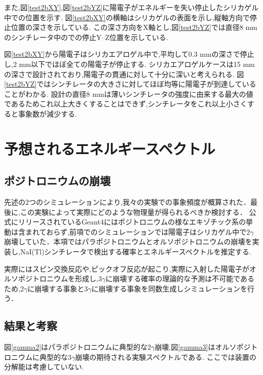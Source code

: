 また,図\ref{test2bXY},図\ref{test2bYZ}に陽電子がエネルギーを失い停止したシリカゲル中での位置を示す.
図\ref{test2bXY}の横軸はシリカゲルの表面を示し,縦軸方向で停止位置の深さを示している.
この深さ方向をX軸とし,図\ref{test2bYZ}では直径8 mmのシンチレータ中のでの停止Y--Z位置を示している.

図\ref{test2bXY}から陽電子はシリカエアロゲル中で,平均して0.3 mmの深さで停止し,2 mm以下でほぼ全ての陽電子が停止する.
シリカエアロゲルケースは15 mmの深さで設計されており,陽電子の貫通に対して十分に深いと考えられる.
図\ref{test2bYZ}ではシンチレータの大きさに対してほぼ均等に陽電子が到達していることがわかる.
設計の直径8 mmは薄いシンチレータの強度に由来する最大の値であるためこれ以上大きくすることはできず,シンチレータをこれ以上小さくすると事象数が減少する.


\section{予想されるエネルギースペクトル}
\label{section_test3}

\subsection{ポジトロニウムの崩壊}

先述の2つのシミュレーションにより,我々の実験での事象頻度が概算された．最後に,この実験によって実際にどのような物理量が得られるべきか検討する．
公式にリリースされているGeant4にはポジトロニウムの様なエキゾチック系の挙動は含まれておらず,前項でのシミュレーションでは陽電子はシリカゲル中で$2\gamma$崩壊していた．本項ではパラポジトロニウムとオルソポジトロニウムの崩壊を実装し,NaI(Tl)シンチレータで検出する確率とエネルギースペクトルを推定する.

実際にはスピン交換反応や,ピックオフ反応が起こり,実際に入射した陽電子がオルソポジトロニウムを形成し,$3\gamma$に崩壊する確率の理論的な予測は不可能であるため,$2\gamma$に崩壊する事象と$3\gamma$に崩壊する事象を同数生成しシミュレーションを行う．

\subsection{結果と考察}

図\ref{gamma2}はパラポジトロニウムに典型的な$2\gamma$崩壊,図\ref{gamma3}はオルソポジトロニウムに典型的な$3\gamma$崩壊の期待される実験スペクトルである.
ここでは装置の分解能は考慮していない.

